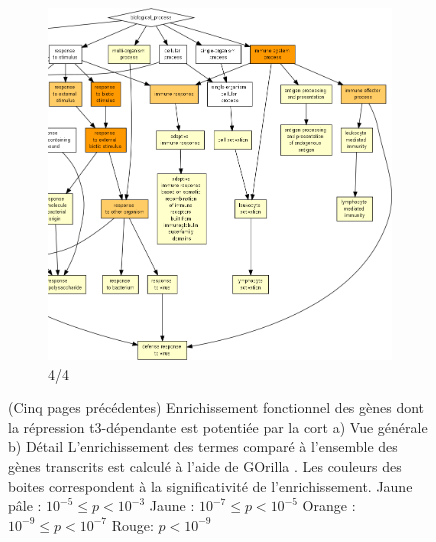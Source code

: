 \begin{figure}[!htp]
\ContinuedFloat
\begin{subfigure}{\textwidth}
\includegraphics[width=\textwidth]
{Figures/hlc-go-pot-down/hlc-go-pot-down_3.png}
\caption{4/4}
\end{subfigure}
\caption[Enrichissement fonctionnel des gènes dont la répression \gls{t3}-dépendante est potentiée par la \gls{cort}]
{
(Cinq pages précédentes) Enrichissement fonctionnel des gènes dont la répression \gls{t3}-dépendante est potentiée par la \gls{cort}
a) Vue générale
b) Détail
L'enrichissement des termes comparé à l'ensemble des gènes transcrits est calculé à l'aide de GOrilla \citep{Eden2009}.
Les couleurs des boites correspondent à la significativité de l'enrichissement.
Jaune pâle : $10^{-5} \leq p < 10^{-3}$
Jaune : $10^{-7} \leq p < 10^{-5}$
Orange : $10^{-9} \leq p < 10^{-7}$
Rouge: $p < 10^{-9}$
}
\label{fig:hlc-go-pot-down}
\end{figure}